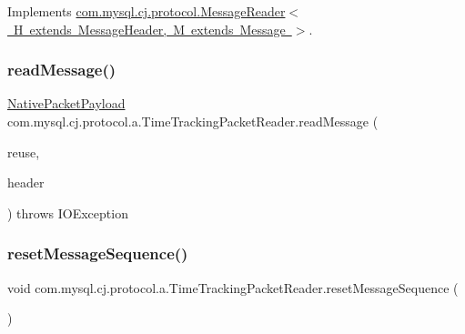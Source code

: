 Implements \mbox{\hyperlink{interfacecom_1_1mysql_1_1cj_1_1protocol_1_1_message_reader_a09745b0e30f74fa13e2b32f22ce70cbb}{com.\+mysql.\+cj.\+protocol.\+Message\+Reader$<$ H extends Message\+Header, M extends Message $>$}}.

\mbox{\label{classcom_1_1mysql_1_1cj_1_1protocol_1_1a_1_1_time_tracking_packet_reader_a6f6c10be80bf6632e4f79e17b893c539}} 
\subsubsection{\texorpdfstring{read\+Message()}{readMessage()}}
{\footnotesize\ttfamily \mbox{\hyperlink{classcom_1_1mysql_1_1cj_1_1protocol_1_1a_1_1_native_packet_payload}{Native\+Packet\+Payload}} com.\+mysql.\+cj.\+protocol.\+a.\+Time\+Tracking\+Packet\+Reader.\+read\+Message (\begin{DoxyParamCaption}\item[{Optional$<$ \mbox{\hyperlink{classcom_1_1mysql_1_1cj_1_1protocol_1_1a_1_1_native_packet_payload}{Native\+Packet\+Payload}} $>$}]{reuse,  }\item[{\mbox{\hyperlink{classcom_1_1mysql_1_1cj_1_1protocol_1_1a_1_1_native_packet_header}{Native\+Packet\+Header}}}]{header }\end{DoxyParamCaption}) throws I\+O\+Exception}

\mbox{\label{classcom_1_1mysql_1_1cj_1_1protocol_1_1a_1_1_time_tracking_packet_reader_a1029b1583cd042d202fa0caa956a13c2}} 
\subsubsection{\texorpdfstring{reset\+Message\+Sequence()}{resetMessageSequence()}}
{\footnotesize\ttfamily void com.\+mysql.\+cj.\+protocol.\+a.\+Time\+Tracking\+Packet\+Reader.\+reset\+Message\+Sequence (\begin{DoxyParamCaption}{ }\end{DoxyParamCaption})}

